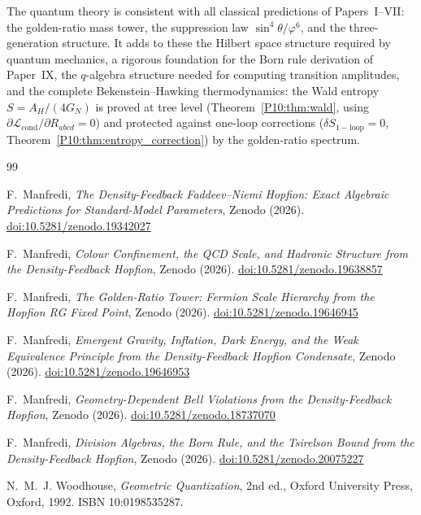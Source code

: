 \documentclass[11pt,a4paper]{article}
\theoremstyle{definition}
\theoremstyle{remark}
\newcommand{\vp}{\varphi}
\begin{document}
The quantum theory is consistent with all classical predictions of
Papers~I--VII: the golden-ratio mass tower, the suppression law
$\sin^4\!\theta/\vp^6$, and the three-generation structure.
It adds to these the Hilbert space structure required by quantum
mechanics, a rigorous foundation for the Born rule
derivation of Paper~IX, the $q$-algebra structure needed for
computing transition amplitudes, and the complete
Bekenstein--Hawking thermodynamics:
the Wald entropy $S = A_H/(4G_N)$ is proved at tree level
(Theorem~\ref{P10:thm:wald}, using $\partial\mathcal{L}_\mathrm{cond}/\partial R_{abcd}=0$)
and protected against one-loop corrections
($\delta S_\mathrm{1-loop}=0$, Theorem~\ref{P10:thm:entropy_correction})
by the golden-ratio spectrum.


\begin{thebibliography}{99}

F.~Manfredi,
\textit{The Density-Feedback Faddeev--Niemi Hopfion:
  Exact Algebraic Predictions for Standard-Model Parameters},
Zenodo (2026).
\href{https://doi.org/10.5281/zenodo.19342027}{doi:10.5281/zenodo.19342027}

F.~Manfredi,
\textit{Colour Confinement, the QCD Scale, and Hadronic Structure
  from the Density-Feedback Hopfion},
Zenodo (2026).
\href{https://doi.org/10.5281/zenodo.19638857}{doi:10.5281/zenodo.19638857}

F.~Manfredi,
\textit{The Golden-Ratio Tower: Fermion Scale Hierarchy from the Hopfion RG Fixed Point},
Zenodo (2026).
\href{https://doi.org/10.5281/zenodo.19646945}{doi:10.5281/zenodo.19646945}
 
F.~Manfredi,
\textit{Emergent Gravity, Inflation, Dark Energy, and the Weak
  Equivalence Principle from the Density-Feedback Hopfion Condensate},
Zenodo (2026).
\href{https://doi.org/10.5281/zenodo.19646953}{doi:10.5281/zenodo.19646953}
 
F.~Manfredi,
\textit{Geometry-Dependent Bell Violations from the Density-Feedback Hopfion},
Zenodo (2026).
\href{https://doi.org/10.5281/zenodo.18737070}{doi:10.5281/zenodo.18737070} 

F.~Manfredi,
\textit{Division Algebras, the Born Rule, and the Tsirelson Bound
  from the Density-Feedback Hopfion},
Zenodo (2026).
\href{https://doi.org/10.5281/zenodo.20075227}{doi:10.5281/zenodo.20075227}

N.~M.~J. Woodhouse,
\textit{Geometric Quantization}, 2nd ed.,
Oxford University Press, Oxford, 1992.
ISBN 10:0198535287.


\end{thebibliography}
\end{document}
